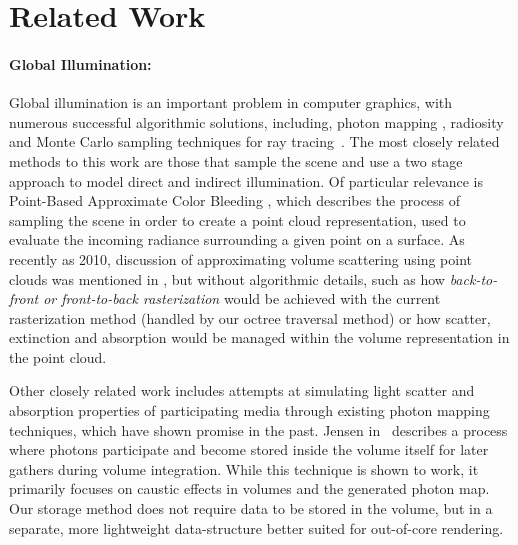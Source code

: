 \documentclass[runningheads]{llncs}
\begin{document}
\section{Related Work}

\paragraph{Global Illumination:}
Global illumination is an important problem in computer graphics, with numerous successful algorithmic solutions, including, photon mapping \cite{Jensen:2009}, radiosity \cite{radiosity} and Monte Carlo sampling techniques for ray tracing~\cite{MCRay1}.  The most closely related methods to this work are those that sample the scene and use a two stage approach to model direct and indirect illumination. Of particular relevance is Point-Based Approximate Color Bleeding \cite{christensen:2008}, which describes the process of sampling the scene in order to create a point cloud representation, used to evaluate the incoming radiance surrounding a given point on a surface.  As recently as 2010, discussion of approximating volume scattering using point clouds was mentioned in \cite{christensen:siggraph}, but without algorithmic details, such as how \textit{back-to-front or front-to-back rasterization} would be achieved with the current rasterization method (handled by our octree traversal method) or how scatter, extinction and absorption would be managed within the volume representation in the point cloud.

Other closely related work includes attempts at simulating light scatter and absorption properties of participating media through existing photon mapping techniques, which have shown promise in the past.  Jensen in~\cite{jensen:1998} describes a process where photons participate and become stored inside the volume itself for later gathers during volume integration.  While this technique is shown to work, it primarily focuses on caustic effects in volumes and the generated photon map.  Our storage method does not require data to be stored in the volume, but in a separate, more lightweight data-structure better suited for out-of-core rendering.
\end{document}
